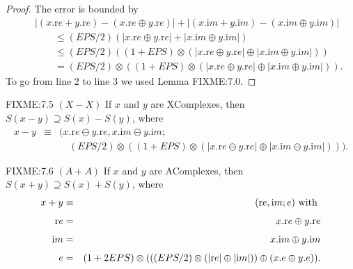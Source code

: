 \begin{definition}
\begin{proof}{}
The error is bounded by
\begin{eqnarray*}
&&|(x.{\mathrm re} + y.{\mathrm re}) - (x.{\mathrm re} \oplus y.{\mathrm re})| + 
  |(x.{\mathrm im} + y.{\mathrm im}) - (x.{\mathrm im} \oplus y.{\mathrm im})|\\[4pt]
&&\qquad \le (EPS/2)(| x.{\mathrm re} \oplus y.{\mathrm re}| + 
   |x.{\mathrm im} \oplus y.{\mathrm im}|)\\[4pt]
&&\qquad \le (EPS/2)((1 + EPS) \otimes (| x.{\mathrm re} \oplus y.{\mathrm re}| \oplus 
   |x.{\mathrm im} \oplus y.{\mathrm im}|))\\[4pt]
&&\qquad = (EPS/2) \otimes ((1 + EPS) \otimes (| x.{\mathrm re} \oplus y.{\mathrm re}| \oplus 
   |x.{\mathrm im} \oplus y.{\mathrm im}|)).
\end{eqnarray*}
To go from line 2 to line 3 we used Lemma FIXME:7.0. \end{proof}

\begin{proposition}{FIXME:7.5 $(X - X)$}
If $x$ and $y$ are {\textrm XComplexes,} then 
$S(x - y) \supseteq S(x) - S(y)${\textrm ,} where
\begin{eqnarray*}
x - y &\equiv& (x.{\mathrm re} \ominus y.{\mathrm re}, x.{\mathrm im} \ominus y.{\mathrm im};\\[4pt]
&&\quad 
(EPS/2)\otimes ((1 + EPS) \otimes (|x.{\mathrm re} \ominus y.{\mathrm re}| \oplus |x.{\mathrm im} \ominus y.{\mathrm im}|))).
\end{eqnarray*} \end{proposition}


\begin{proposition}{FIXME:7.6 $(A + A)$} 
If $x$ and $y$ are {\textrm AComplexes,} then 
$S(x + y) \supseteq S(x) + S(y)${\textrm ,} where
\begin{eqnarray*}
 x+y &\equiv& ({\mathrm re},{\mathrm im};e) \hbox{ with }\\[4pt]
{\mathrm re}& =& x.{\mathrm re} \oplus y.{\mathrm re}\\[4pt]
{\mathrm im}& =& x.{\mathrm im} \oplus y.{\mathrm im}\\[4pt]
e& =& (1 + 2 EPS) \otimes ( ((EPS/2) \otimes (|{\mathrm re}| \oplus |{\mathrm im}|))
 \oplus (x.e \oplus y.e)). \end{eqnarray*}
\end{proposition}


\end{definition}
